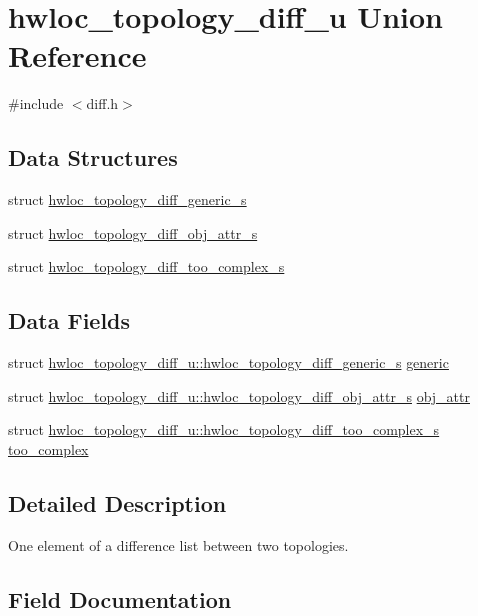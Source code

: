 \hypertarget{a00350}{}\section{hwloc\+\_\+topology\+\_\+diff\+\_\+u Union Reference}
\label{a00350}


{\ttfamily \#include $<$diff.\+h$>$}

\subsection*{Data Structures}
\begin{DoxyCompactItemize}
\item 
struct \hyperlink{a00354}{hwloc\+\_\+topology\+\_\+diff\+\_\+generic\+\_\+s}
\item 
struct \hyperlink{a00358}{hwloc\+\_\+topology\+\_\+diff\+\_\+obj\+\_\+attr\+\_\+s}
\item 
struct \hyperlink{a00362}{hwloc\+\_\+topology\+\_\+diff\+\_\+too\+\_\+complex\+\_\+s}
\end{DoxyCompactItemize}
\subsection*{Data Fields}
\begin{DoxyCompactItemize}
\item 
struct \hyperlink{a00354}{hwloc\+\_\+topology\+\_\+diff\+\_\+u\+::hwloc\+\_\+topology\+\_\+diff\+\_\+generic\+\_\+s} \hyperlink{a00350_af1882d9c9d37c735a0e9b04069fab01f}{generic}
\item 
struct \hyperlink{a00358}{hwloc\+\_\+topology\+\_\+diff\+\_\+u\+::hwloc\+\_\+topology\+\_\+diff\+\_\+obj\+\_\+attr\+\_\+s} \hyperlink{a00350_a7245713f0f49e9f08fda28401a4f98fd}{obj\+\_\+attr}
\item 
struct \hyperlink{a00362}{hwloc\+\_\+topology\+\_\+diff\+\_\+u\+::hwloc\+\_\+topology\+\_\+diff\+\_\+too\+\_\+complex\+\_\+s} \hyperlink{a00350_adaaabee4029a455119ec3695c19632d6}{too\+\_\+complex}
\end{DoxyCompactItemize}


\subsection{Detailed Description}
One element of a difference list between two topologies. 

\subsection{Field Documentation}
\mbox{\label{a00350_af1882d9c9d37c735a0e9b04069fab01f}} 
